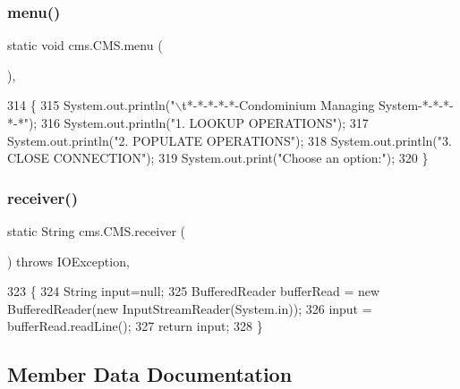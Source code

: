 \subsubsection{\texorpdfstring{menu()}{menu()}}
{\footnotesize\ttfamily static void cms.\+C\+M\+S.\+menu (\begin{DoxyParamCaption}{ }\end{DoxyParamCaption})\hspace{0.3cm}{\ttfamily [inline]}, {\ttfamily [static]}}


\begin{DoxyCode}
314                              \{
315         System.out.println(\textcolor{stringliteral}{"\(\backslash\)t*-*-*-*-*-Condominium Managing System-*-*-*-*-*"});
316         System.out.println(\textcolor{stringliteral}{"1. LOOKUP OPERATIONS"});
317         System.out.println(\textcolor{stringliteral}{"2. POPULATE OPERATIONS"});
318         System.out.println(\textcolor{stringliteral}{"3. CLOSE CONNECTION"});
319         System.out.print(\textcolor{stringliteral}{"Choose an option:"});
320     \}
\end{DoxyCode}
\mbox{\label{classcms_1_1_c_m_s_ad13be0e97a0bb295dcedd134942a79b4}} 
\subsubsection{\texorpdfstring{receiver()}{receiver()}}
{\footnotesize\ttfamily static String cms.\+C\+M\+S.\+receiver (\begin{DoxyParamCaption}{ }\end{DoxyParamCaption}) throws I\+O\+Exception\hspace{0.3cm}{\ttfamily [inline]}, {\ttfamily [static]}}


\begin{DoxyCode}
323                                                       \{
324         String input=null;
325         BufferedReader bufferRead = \textcolor{keyword}{new} BufferedReader(\textcolor{keyword}{new} InputStreamReader(System.in));
326         input = bufferRead.readLine();
327         \textcolor{keywordflow}{return} input;
328     \}
\end{DoxyCode}


\subsection{Member Data Documentation}
\mbox{\label{classcms_1_1_c_m_s_afc28cfd2c4356509b85775219b7b1e05}} 
